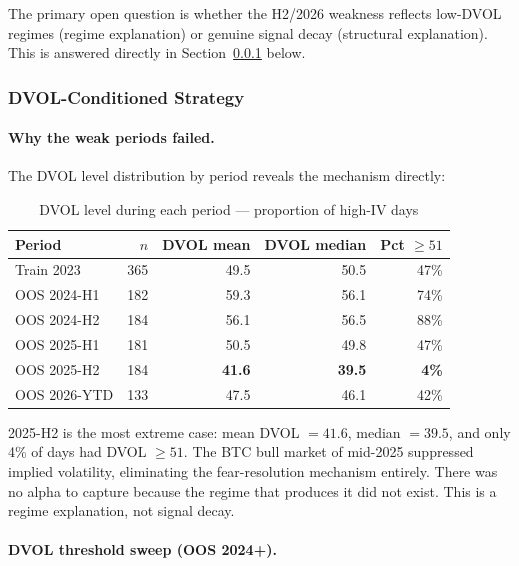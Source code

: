 \documentclass[12pt, a4paper]{article}
\theoremstyle{definition}
\begin{document}
The primary open question is whether the H2/2026 weakness reflects low-DVOL
regimes (regime explanation) or genuine signal decay (structural explanation).
This is answered directly in Section~\ref{sec:n3_regime_filter} below.

\subsubsection{DVOL-Conditioned Strategy}
\label{sec:n3_regime_filter}

\paragraph{Why the weak periods failed.}
The DVOL level distribution by period reveals the mechanism directly:

\begin{table}[ht]
\centering
\caption{DVOL level during each period — proportion of high-IV days}
\label{tab:dvol_dist}
\begin{tabular}{lrrrr}
\toprule
Period & $n$ & DVOL mean & DVOL median & Pct $\geq 51$ \\
\midrule
Train 2023   & 365 & 49.5 & 50.5 & 47\% \\
OOS 2024-H1  & 182 & 59.3 & 56.1 & 74\% \\
OOS 2024-H2  & 184 & 56.1 & 56.5 & 88\% \\
OOS 2025-H1  & 181 & 50.5 & 49.8 & 47\% \\
OOS 2025-H2  & 184 & \textbf{41.6} & \textbf{39.5} & \textbf{4\%} \\
OOS 2026-YTD & 133 & 47.5 & 46.1 & 42\% \\
\bottomrule
\end{tabular}
\end{table}

2025-H2 is the most extreme case: mean DVOL $= 41.6$, median $= 39.5$, and
only 4\% of days had DVOL $\geq 51$.  The BTC bull market of mid-2025
suppressed implied volatility, eliminating the fear-resolution mechanism
entirely.  There was no alpha to capture because the regime that produces it
did not exist.  This is a regime explanation, not signal decay.

\paragraph{DVOL threshold sweep (OOS 2024+).}
\end{document}
